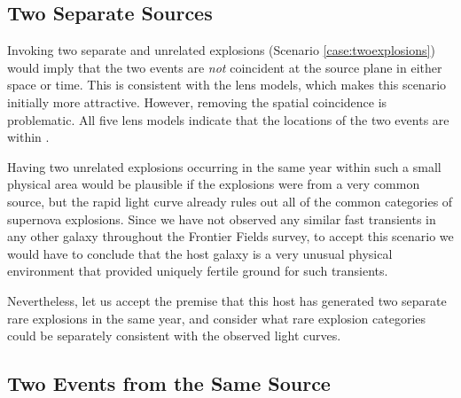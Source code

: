 \subsection{Two Separate Sources}

Invoking two separate and unrelated explosions (Scenario
\ref{case:twoexplosions}) would imply that the two events are {\it
  not} coincident at the source plane in either space or time.  This
is consistent with the lens models, which makes this scenario
initially more attractive.  However, removing the spatial coincidence
is problematic.  All five lens models indicate that the locations of
the two events are within .


Having two unrelated explosions occurring in the same
year within such a small physical area would be plausible if the
explosions were from a very common source, but the rapid light curve
already rules out all of the common categories of supernova explosions.
Since we have not observed any similar fast transients in any other
galaxy throughout the Frontier Fields survey, to accept this scenario
we would have to conclude that the \spock host galaxy is a very
unusual physical environment that provided uniquely fertile ground for
such transients.


Nevertheless, let us accept the premise that this host has generated
two separate rare explosions in the same year, and consider what rare
explosion categories could be separately consistent with the observed
light curves.




\subsection{Two Events from the Same Source}

